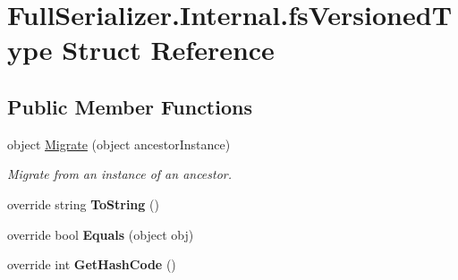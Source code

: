 \hypertarget{struct_full_serializer_1_1_internal_1_1fs_versioned_type}{}\section{Full\+Serializer.\+Internal.\+fs\+Versioned\+Type Struct Reference}
\label{struct_full_serializer_1_1_internal_1_1fs_versioned_type}
\subsection*{Public Member Functions}
\begin{DoxyCompactItemize}
\item 
object \hyperlink{struct_full_serializer_1_1_internal_1_1fs_versioned_type_aefcd1ab3a71a9c8d5d9740bfc4d2bec2}{Migrate} (object ancestor\+Instance)
\begin{DoxyCompactList}\small\item\em Migrate from an instance of an ancestor. \end{DoxyCompactList}\item 
\mbox{\label{struct_full_serializer_1_1_internal_1_1fs_versioned_type_a00a4df4bd28d37f0ce3eba8d478cfb0c}} 
override string {\bfseries To\+String} ()
\item 
\mbox{\label{struct_full_serializer_1_1_internal_1_1fs_versioned_type_a03287eaf9b0c058981d26039ee69e12d}} 
override bool {\bfseries Equals} (object obj)
\item 
\mbox{\label{struct_full_serializer_1_1_internal_1_1fs_versioned_type_a6c89963039a787e467fbb6b14314f190}} 
override int {\bfseries Get\+Hash\+Code} ()
\end{DoxyCompactItemize}
